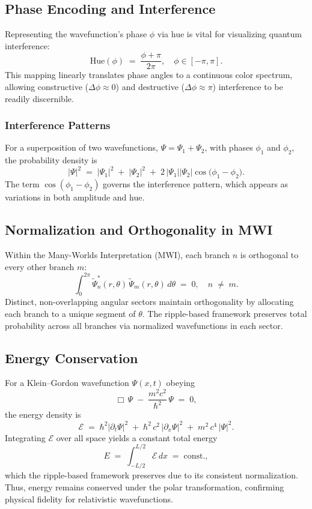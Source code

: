 \subsection{Phase Encoding and Interference}
Representing the wavefunction’s phase \(\phi\) via hue is vital for visualizing quantum interference:
\[
\text{Hue}(\phi) \;=\; \frac{\phi + \pi}{2\pi}, 
\quad \phi \in [-\pi, \pi].
\]
This mapping linearly translates phase angles to a continuous color spectrum, allowing constructive (\(\Delta \phi \approx 0\)) and destructive (\(\Delta \phi \approx \pi\)) interference to be readily discernible.

\subsubsection{Interference Patterns}
For a superposition of two wavefunctions, \(\Psi = \Psi_1 + \Psi_2\), with phases \(\phi_1\) and \(\phi_2\), the probability density is
\[
\bigl|\Psi\bigr|^2
\;=\;
\bigl|\Psi_1\bigr|^2
\;+\;
\bigl|\Psi_2\bigr|^2
\;+\;
2\,\bigl|\Psi_1\bigr|\bigl|\Psi_2\bigr|\cos\bigl(\phi_1 - \phi_2\bigr).
\]
The term \(\cos(\phi_1 - \phi_2)\) governs the interference pattern, which appears as variations in both amplitude and hue.

\subsection{Normalization and Orthogonality in MWI}
Within the Many-Worlds Interpretation (MWI), each branch \(n\) is orthogonal to every other branch \(m\):
\[
\int_{0}^{2\pi}
\tilde{\Psi}_n^*(r,\theta)\,\tilde{\Psi}_m(r,\theta)\,d\theta
\;=\; 0,
\quad n \;\neq\; m.
\]
Distinct, non-overlapping angular sectors maintain orthogonality by allocating each branch to a unique segment of \(\theta\). The ripple-based framework preserves total probability across all branches via normalized wavefunctions in each sector.

\subsection{Energy Conservation}
For a Klein--Gordon wavefunction \(\Psi(x,t)\) obeying
\[
\Box\,\Psi
\;-\;
\frac{m^2 c^2}{\hbar^2}\,\Psi
\;=\; 0,
\]
the energy density is
\[
\mathcal{E}
\;=\;
\hbar^2\bigl|\partial_t \Psi\bigr|^2
\;+\;
\hbar^2\,c^2\,\bigl|\partial_x \Psi\bigr|^2
\;+\;
m^2\,c^4\,\bigl|\Psi\bigr|^2.
\]
Integrating \(\mathcal{E}\) over all space yields a constant total energy
\[
E
\;=\;
\int_{-L/2}^{L/2}
\mathcal{E}\,dx
\;=\;
\text{const.},
\]
which the ripple-based framework preserves due to its consistent normalization. Thus, energy remains conserved under the polar transformation, confirming physical fidelity for relativistic wavefunctions.


\newpage
